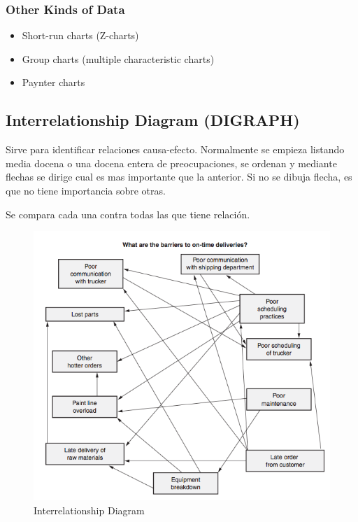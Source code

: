 \documentclass[]{article}
\begin{document}
\subsubsection{Other Kinds of Data}

\begin{itemize}
	\item Short-run charts (Z-charts)
	\item Group charts (multiple characteristic charts)
	\item Paynter charts
\end{itemize}

\subsection{Interrelationship Diagram (DIGRAPH)}

Sirve para identificar relaciones causa-efecto. Normalmente se empieza listando media docena o una docena entera de preocupaciones, se ordenan y mediante flechas se dirige cual es mas importante que la anterior. Si no se dibuja flecha, es que no tiene importancia sobre otras.

Se compara cada una contra todas las que tiene relación. 

\begin{figure}[H]
	\centering
	\includegraphics[width=120mm]{imagenes/interrelationshipdiagram.png}
	\caption{Interrelationship Diagram}
	\label{fig:interrelationshipdiagram}
\end{figure}
\end{document}

